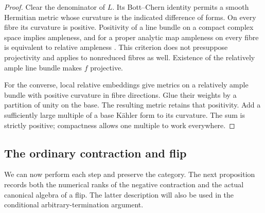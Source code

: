 \begin{proof}
Clear the denominator of $L$.  Its Bott--Chern identity permits a smooth
Hermitian metric whose curvature is the indicated difference of forms.
On every fibre its curvature is positive.  Positivity of a line bundle
on a compact complex space implies ampleness, and for a proper analytic
map ampleness on every fibre is equivalent to relative ampleness
\cite[Corollary~1.12 and Definition~3.1--Remark~3.2]{FujinoVanishing2026}.
This criterion does not presuppose projectivity and applies to
nonreduced fibres as well.  Existence of the relatively ample line bundle
makes $f$ projective.

For the converse, local relative embeddings give metrics on a relatively
ample bundle with positive curvature in fibre directions.  Glue their
weights by a partition of unity on the base.  The resulting metric
retains that positivity.  Add a sufficiently large multiple of a base
K\"ahler form to its curvature.  The sum is strictly positive; compactness
allows one multiple to work everywhere.
\end{proof}

\subsection{The ordinary contraction and flip}

We can now perform each step and preserve the category.  The next
proposition records both the numerical ranks of the negative contraction
and the actual canonical algebra of a flip.  The latter description will
also be used in the conditional arbitrary-termination argument.

